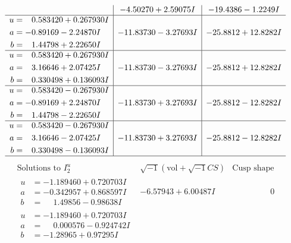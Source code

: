 \documentclass[1p]{elsarticle_modified}
\theoremstyle{definition}
\newcommand{\I}{\sqrt{-1}}
\begin{document}
$$\begin{array}{c|c|c}
 & -4.50270 + 2.59075 I & -19.4386 - 1.2249 I \\ \hline\begin{aligned}
u &= \phantom{-}0.583420 + 0.267930 I \\
a &= -0.89169 - 2.24870 I \\
b &= \phantom{-}1.44798 + 2.22650 I\end{aligned}
 & -11.83730 - 3.27693 I & -25.8812 + 12.8282 I \\ \hline\begin{aligned}
u &= \phantom{-}0.583420 + 0.267930 I \\
a &= \phantom{-}3.16646 + 2.07425 I \\
b &= \phantom{-}0.330498 + 0.136093 I\end{aligned}
 & -11.83730 - 3.27693 I & -25.8812 + 12.8282 I \\ \hline\begin{aligned}
u &= \phantom{-}0.583420 - 0.267930 I \\
a &= -0.89169 + 2.24870 I \\
b &= \phantom{-}1.44798 - 2.22650 I\end{aligned}
 & -11.83730 + 3.27693 I & -25.8812 - 12.8282 I \\ \hline\begin{aligned}
u &= \phantom{-}0.583420 - 0.267930 I \\
a &= \phantom{-}3.16646 - 2.07425 I \\
b &= \phantom{-}0.330498 - 0.136093 I\end{aligned}
 & -11.83730 + 3.27693 I & -25.8812 - 12.8282 I\\
 \hline 
 \end{array}$$\newpage$$\begin{array}{c|c|c}  
\text{Solutions to }I^u_{2}& \I (\text{vol} + \sqrt{-1}CS) & \text{Cusp shape}\\
 \hline 
\begin{aligned}
u &= -1.189460 + 0.720703 I \\
a &= -0.342957 + 0.868597 I \\
b &= \phantom{-}1.49856 - 0.98638 I\end{aligned}
 & -6.57943 + 6.00487 I & \phantom{-0.000000 } 0 \\ \hline\begin{aligned}
u &= -1.189460 + 0.720703 I \\
a &= \phantom{-}0.000576 - 0.924742 I \\
b &= -1.28965 + 0.97295 I\end{aligned}

\end{array}$$
\end{document}
